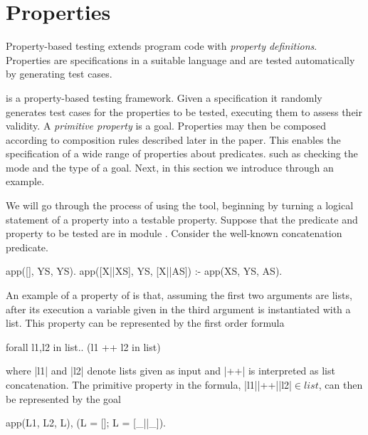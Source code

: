 


\section{Properties}
\label{sec:properties}

Property-based testing extends program code with {\em property definitions}.
%
Properties are specifications in a suitable language and are tested
automatically by generating test cases.



\plqc{} is a property-based testing framework.
%
%
Given a specification it randomly generates test cases for the properties to be tested,
 executing them to assess their validity.
%
A \emph{primitive property} is a \Prolog{} goal. %
%
Properties may then be composed according to composition rules described
later in the paper.
%
This enables the specification of a wide range of properties about
predicates. %
such as checking the mode and the type of a goal.
%
%
Next, in this section we introduce \plqc{} through an example.



We will go through the process of using the tool, beginning by turning a logical
statement of a property into a \plqc{} testable property.
%
Suppose that the predicate and property to be tested are in module .
%
Consider the well-known concatenation predicate.
%
\begin{yapcode}
 app([], YS, YS).
 app([X||XS], YS, [X||AS]) :- app(XS, YS, AS).
\end{yapcode}
%
An example of a property of  is that, assuming the first two
arguments are lists, after its execution a variable given in the third
argument is instantiated with a list.
%
This property can be represented by the first order formula
%
\begin{code}
     forall l1,l2 in list.. (l1 ++ l2 in list) 
\end{code}
where |l1| and |l2| denote  lists given as input and |++| is interpreted
as list concatenation. 
% 
The primitive property in the formula, |l1|{}|++|{}|l2|$\in$$list$,  can
then be represented by the goal
\begin{yapcode}
  app(L1, L2, L), (L = []; L = [_||_]).
\end{yapcode}







